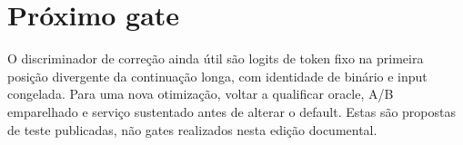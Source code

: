 \section{Próximo gate}
O discriminador de correção ainda útil são logits de token fixo na primeira posição divergente da continuação longa, com identidade de binário e input congelada. Para uma nova otimização, voltar a qualificar oracle, A/B emparelhado e serviço sustentado antes de alterar o default. Estas são propostas de teste publicadas, não gates realizados nesta edição documental. 
